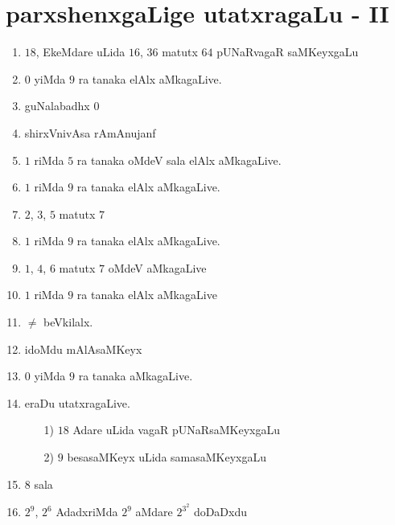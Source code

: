 \chapter{parxshenxgaLige utatxragaLu - {\rm II}}

\begin{enumerate}
  \renewcommand{\labelenumi}{\rm(\theenumi)}
  \itemsep=1pt
\item $18$, EkeMdare uLida $16$, $36$ matutx $64$ pUNaRvagaR saMKeyxgaLu 

\item $0$ yiMda $9$ ra tanaka elAlx aMkagaLive.

\item guNalabadhx $0$

\item shirxVnivAsa rAmAnujanf

\item $1$ riMda $5$ ra tanaka oMdeV sala elAlx aMkagaLive.

\item $1$ riMda $9$ ra tanaka elAlx aMkagaLive.

\item $2$, $3$, $5$ matutx $7$

\item $1$ riMda $9$ ra tanaka elAlx aMkagaLive.

\item $1$, $4$, $6$ matutx $7$ oMdeV aMkagaLive

\item $1$ riMda $9$ ra tanaka elAlx aMkagaLive

\item $\neq$ beVkilalx.

 \item idoMdu mAlAsaMKeyx

\item $0$ yiMda $9$ ra tanaka aMkagaLive.

\eject
 
  
\item eraDu utatxragaLive.
  \begin{itemize}
  \item[{\rm 1)}] $18$ Adare uLida vagaR pUNaRsaMKeyxgaLu

  \item[{\rm 2)}] $9$ besasaMKeyx uLida samasaMKeyxgaLu
      \end{itemize}

\item $8$ sala 

  
\item $2^9$, $2^6$ AdadxriMda $2^9$ aMdare $2^{3^2}$ doDaDxdu


\end{enumerate}
